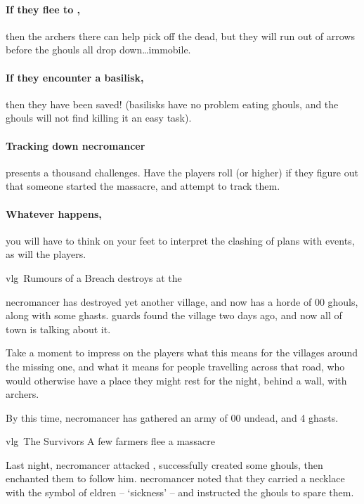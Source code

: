 \paragraph{If they flee to ,}
then the archers there can help pick off the dead, but they will run out of arrows before the ghouls all drop down\ldots immobile.

\paragraph{If they encounter a basilisk,}
then they have been saved!
(basilisks have no problem eating ghouls, and the ghouls will not find killing it an easy task).

\paragraph{Tracking down \gls{necromancer}}
presents a thousand challenges.
Have the players roll  (\tn[14] or higher) if they figure out that someone started the massacre, and attempt to track them.

\paragraph{Whatever happens,}
you will have to think on your feet to interpret the clashing of plans with events, as will the players.

{\gls{vlg}~\squash Rumours of a Breach}%
{ destroys  at the }%
\label{necroRumours}

\Gls{necromancer} has destroyed yet another \gls{village}, and now has a horde of 00 ghouls, along with some ghasts.
\Glspl{guard} found the \gls{village} two days ago, and now all of \gls{town} is talking about it.

Take a moment to impress on the players what this means for the \glspl{village} around the missing one, and what it means for people travelling across that road, who would otherwise have a place they might rest for the night, behind a wall, with archers.

By this time, \gls{necromancer} has gathered an army of 00 undead, and 4 ghasts.

{\gls{vlg}~The Survivors}%
{A few farmers flee a massacre}%

\begin{exampletext}
  Last night, \gls{necromancer} attacked , successfully created some ghouls, then enchanted them to follow him.
  \Gls{necromancer} noted that they carried a necklace with the symbol of \gls{eldren} -- `\gls{sickness}' -- and instructed the ghouls to spare them.
\end{exampletext}

